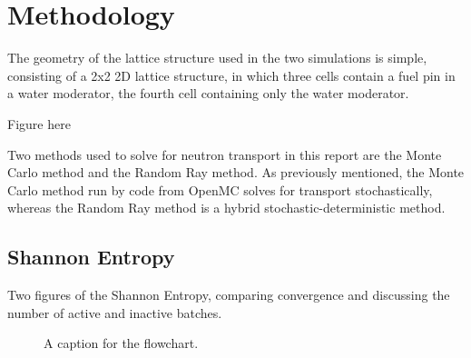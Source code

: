 \pagebreak
\section{Methodology}
\label{sec:methods}
The geometry of the lattice structure used in the two simulations is simple, consisting of a 2x2 2D lattice structure, in which three cells contain a fuel pin in a water moderator, the fourth cell containing only the water moderator.

Figure here

Two methods used to solve for neutron transport in this report are the Monte Carlo method and the Random Ray method. As previously mentioned, the Monte Carlo method run by code from OpenMC solves for transport stochastically, whereas the Random Ray method is a hybrid stochastic-deterministic method.

\pagebreak
\subsection{Shannon Entropy}
Two figures of the Shannon Entropy, comparing convergence and discussing the number of active and inactive batches.
\begin{figure}[h]
        \centering
{}
\caption{A caption for the flowchart.}
\label{fig:comp}
\end{figure}


